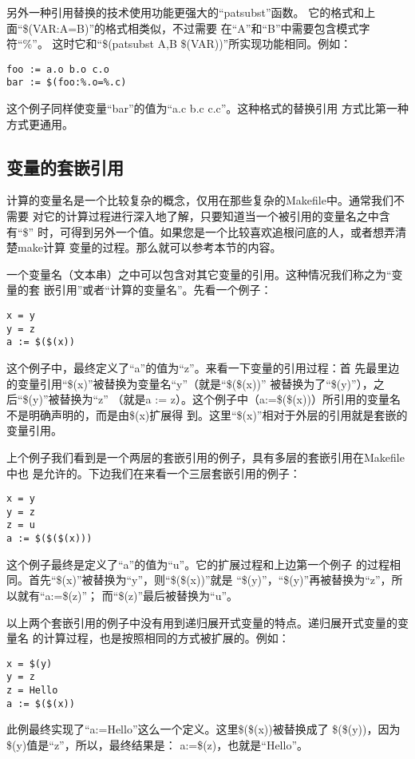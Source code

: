 另外一种引用替换的技术使用功能更强大的“patsubst”函数。%
它的格式和上面“\$(VAR:A=B)”的格式相类似，不过需要%
在“A”和“B”中需要包含模式字符“\%”。%
这时它和“\$(patsubst A,B \$(VAR))”所实现功能相同。例如：
\begin{Verbatim}[]
foo := a.o b.o c.o
bar := $(foo:%.o=%.c)
\end{Verbatim}

这个例子同样使变量“bar”的值为“a.c b.c c.c”。这种格式的替换引用
方式比第一种方式更通用。

\subsection{变量的套嵌引用}
计算的变量名是一个比较复杂的概念，仅用在那些复杂的Makefile中。通常我们不需要
对它的计算过程进行深入地了解，只要知道当一个被引用的变量名之中含有“\$”
时，可得到另外一个值。如果您是一个比较喜欢追根问底的人，或者想弄清楚make计算
变量的过程。那么就可以参考本节的内容。

一个变量名（文本串）之中可以包含对其它变量的引用。这种情况我们称之为“变量的套
嵌引用”或者“计算的变量名”。先看一个例子：
\begin{Verbatim}[]
x = y
y = z
a := $($(x))
\end{Verbatim}

这个例子中，最终定义了“a”的值为“z”。来看一下变量的引用过程：首%
先最里边的变量引用“\$(x)”被替换为变量名“y”（就是“\$(\$(x))”
被替换为了“\$(y)”），之后“\$(y)”被替换为“z”%
（就是a := z）。这个例子中（a:=\$(\$(x))）所引用的变量名%
不是明确声明的，而是由\$(x)扩展得%
到。这里“\$(x)”相对于外层的引用就是套嵌的变量引用。

上个例子我们看到是一个两层的套嵌引用的例子，具有多层的套嵌引用在Makefile中也
是允许的。下边我们在来看一个三层套嵌引用的例子：
\begin{Verbatim}[]
x = y
y = z
z = u
a := $($($(x)))
\end{Verbatim}

这个例子最终是定义了“a”的值为“u”。它的扩展过程和上边第一个例子
的过程相同。首先“\$(x)”被替换为“y”，则“\$(\$(x))”就是
“\$(y)”，“\$(y)”再被替换为“z”，所以就有“a:=\$(z)”；
而“\$(z)”最后被替换为“u”。

以上两个套嵌引用的例子中没有用到递归展开式变量的特点。递归展开式变量的变量名
的计算过程，也是按照相同的方式被扩展的。例如：
\begin{Verbatim}[]
x = $(y)
y = z
z = Hello
a := $($(x))
\end{Verbatim}

此例最终实现了“a:=Hello”这么一个定义。这里\$(\$(x))被替换成了
\$(\$(y))，因为\$(y)值是“z”，所以，最终结果是：%
a:=\$(z)，也就是“Hello”。

